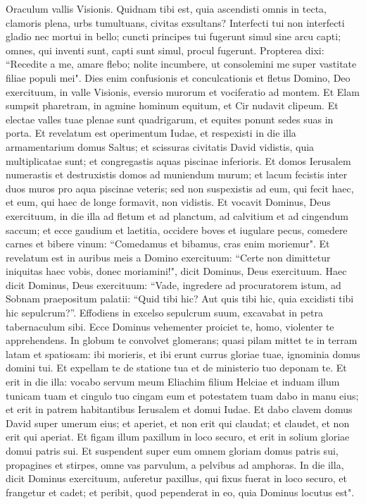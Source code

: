 \begin{biblechapter}  
\verse Oraculum vallis Visionis. Quidnam tibi est, quia ascendisti omnis in tecta, 
\verse clamoris plena, urbs tumultuans, civitas exsultans? Interfecti tui non interfecti gladio nec mortui in bello; 
\verse cuncti principes tui fugerunt simul sine arcu capti; omnes, qui inventi sunt, capti sunt simul, procul fugerunt. 
\verse Propterea dixi: “Recedite a me, amare flebo; nolite incumbere, ut consolemini me super vastitate filiae populi mei". 
\verse Dies enim confusionis et conculcationis et fletus Domino, Deo exercituum, in valle Visionis, eversio murorum et vociferatio ad montem. 
\verse Et Elam sumpsit pharetram, in agmine hominum equitum, et Cir nudavit clipeum. 
\verse Et electae valles tuae plenae sunt quadrigarum, et equites ponunt sedes suas in porta. 
\verse Et revelatum est operimentum Iudae, et respexisti in die illa armamentarium domus Saltus; 
\verse et scissuras civitatis David vidistis, quia multiplicatae sunt; et congregastis aquas piscinae inferioris. 
\verse Et domos Ierusalem numerastis et destruxistis domos ad muniendum murum; 
\verse et lacum fecistis inter duos muros pro aqua piscinae veteris; sed non suspexistis ad eum, qui fecit haec, et eum, qui haec de longe formavit, non vidistis. 
\verse Et vocavit Dominus, Deus exercituum, in die illa ad fletum et ad planctum, ad calvitium et ad cingendum saccum; 
\verse et ecce gaudium et laetitia, occidere boves et iugulare pecus, comedere carnes et bibere vinum: “Comedamus et bibamus, cras enim moriemur". 
\verse Et revelatum est in auribus meis a Domino exercituum: “Certe non dimittetur iniquitas haec vobis, donec moriamini!", dicit Dominus, Deus exercituum. 
\verse Haec dicit Dominus, Deus exercituum: “Vade, ingredere ad procuratorem istum, ad Sobnam praepositum palatii: 
\verse “Quid tibi hic? Aut quis tibi hic, quia excidisti tibi hic sepulcrum?”. Effodiens in excelso sepulcrum suum, excavabat in petra tabernaculum sibi. 
\verse Ecce Dominus vehementer proiciet te, homo, violenter te apprehendens. 
\verse In globum te convolvet glomerans; quasi pilam mittet te in terram latam et spatiosam: ibi morieris, et ibi erunt currus gloriae tuae, ignominia domus domini tui. 
\verse Et expellam te de statione tua et de ministerio tuo deponam te. 
\verse Et erit in die illa: vocabo servum meum Eliachim filium Helciae 
\verse et induam illum tunicam tuam et cingulo tuo cingam eum et potestatem tuam dabo in manu eius; et erit in patrem habitantibus Ierusalem et domui Iudae. 
\verse Et dabo clavem domus David super umerum eius; et aperiet, et non erit qui claudat; et claudet, et non erit qui aperiat. 
\verse Et figam illum paxillum in loco securo, et erit in solium gloriae domui patris sui. 
\verse Et suspendent super eum omnem gloriam domus patris sui, propagines et stirpes, omne vas parvulum, a pelvibus ad amphoras. 
\verse In die illa, dicit Dominus exercituum, auferetur paxillus, qui fixus fuerat in loco securo, et frangetur et cadet; et peribit, quod pependerat in eo, quia Dominus locutus est". 
\end{biblechapter}

